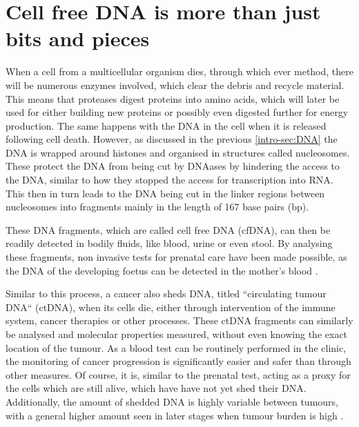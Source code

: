 \section[cfDNA]{Cell free DNA is more than just bits and pieces}
\label{intro-sec:ctDNA}

When a cell from a multicellular organism dies, through which ever method, there will be numerous enzymes involved, which clear the debris and recycle material. This means that proteases digest proteins into amino acids, which will later be used for either building new proteins or possibly even digested further for energy production. The same happens with the DNA in the cell when it is released following cell death. However, as discussed in the previous \autoref{intro-sec:DNA} the DNA is wrapped around histones and organised in structures called nucleosomes. These protect the DNA from being cut by DNAases by hindering the access to the DNA, similar to how they stopped the access for transcription into RNA. This then in turn leads to the DNA being cut in the linker regions between nucleosomes into fragments mainly in the length of 167 base pairs (bp). 

These DNA fragments, which are called cell free DNA (cfDNA), can then be readily detected in bodily fluids, like blood, urine or even stool. By analysing these fragments, non invasive tests for prenatal care have been made possible, as the DNA of the developing foetus can be detected in the mother's blood \cite{Dan2012,Nicolaides2013}.

Similar to this process, a cancer also sheds DNA, titled ``circulating tumour DNA`` (ctDNA), when its cells die, either through intervention of the immune system, cancer therapies or other processes. These ctDNA fragments can similarly be analysed and molecular properties measured, without even knowing the exact location of the tumour. As a blood test can be routinely performed in the clinic, the monitoring of cancer progression is significantly easier and safer than through other measures. Of course, it is, similar to the prenatal test, acting as a proxy for the cells which are still alive, which have have not yet shed their DNA. Additionally, the amount of shedded DNA is highly variable between tumours, with a general higher amount seen in later stages when tumour burden is high \cite{Diehl2008,Schwarzenbach2011}.

